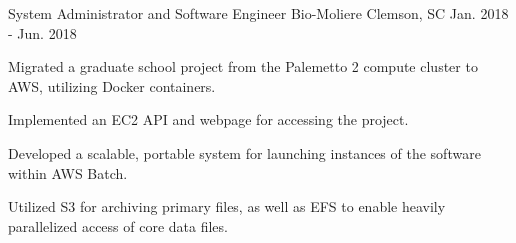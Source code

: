\begin{cventries}
  \cventry
    {System Administrator and Software Engineer}
    {Bio-Moliere}
    {Clemson, SC}
    {Jan. 2018 - Jun. 2018}
    {
      \begin{cvitems}
        \item {Migrated a graduate school project from the Palemetto 2 compute cluster to AWS, utilizing Docker containers.}
        \item {Implemented an EC2 API and webpage for accessing the project.}
        \item {Developed a scalable, portable system for launching instances of the software within AWS Batch.}
        \item {Utilized S3 for archiving primary files, as well as EFS to enable heavily parallelized access of core data files.}
      \end{cvitems}
    }

\end{cventries}
